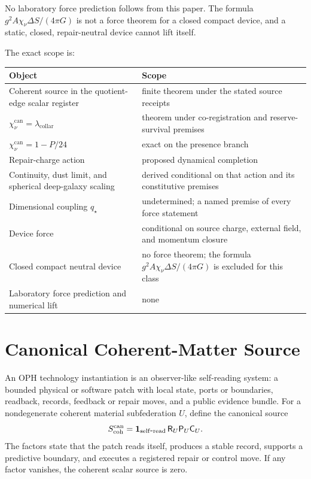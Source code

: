 \documentclass[11pt]{article}
\numberwithin{equation}{section}
\theoremstyle{remark}
\newcommand{\chinu}{\chi_\nu}
\newcommand{\chican}{\chi_\nu^{\mathrm{can}}}
\newcommand{\scohcan}{S_{\mathrm{coh}}^{\mathrm{can}}}
\newcommand{\lambdac}{\lambda_{\mathrm{collar}}}
\begin{document}
No laboratory force prediction follows from this paper. The formula
\(g^2A\chinu\Delta S/(4\pi G)\) is not a force theorem for a closed compact
device, and a static, closed, repair-neutral device cannot lift itself.

The exact scope is:
\begin{center}
\begin{tabularx}{0.94\textwidth}{@{}lX@{}}
\toprule
Object & Scope \\
\midrule
Coherent source in the quotient-edge scalar register & finite theorem under the stated source receipts \\
\(\chican=\lambdac\) & theorem under co-registration and reserve-survival premises \\
\(\chican=1-P/24\) & exact on the presence branch \\
Repair-charge action & proposed dynamical completion \\
Continuity, dust limit, and spherical deep-galaxy scaling & derived conditional on that action and its constitutive premises \\
Dimensional coupling \(q_\star\) & undetermined; a named premise of every force statement \\
Device force & conditional on source charge, external field, and momentum closure \\
Closed compact neutral device & no force theorem; the formula \(g^2A\chinu\Delta S/(4\pi G)\) is excluded for this class \\
Laboratory force prediction and numerical lift & none \\
\bottomrule
\end{tabularx}
\end{center}

\tableofcontents

\section{Canonical Coherent-Matter Source}

An OPH technology instantiation is an observer-like self-reading system: a
bounded physical or software patch with local state, ports or boundaries,
readback, records, feedback or repair moves, and a public evidence bundle. For
a nondegenerate coherent material subfederation \(U\), define the canonical
source
\begin{equation}
\scohcan
=\mathbf 1_{\rm self\mbox{-}read}\,\mathsf R_U\mathsf P_U\mathsf C_U.
\label{eq:source}
\end{equation}
The factors state that the patch reads itself, produces a stable record,
supports a predictive boundary, and executes a registered repair or control
move. If any factor vanishes, the coherent scalar source is zero.
\end{document}
